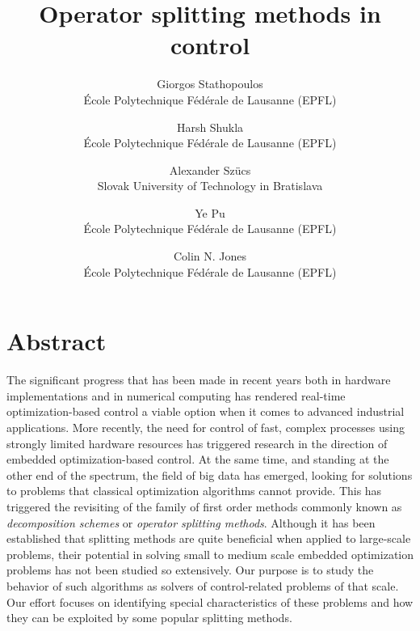 \documentclass[paper=a4, fontsize=11pt]{scrartcl}
\date{}
\title{Operator splitting methods in control}
\begin{document}
\author{
Giorgos Stathopoulos \\
\'Ecole Polytechnique F\'ed\'erale de Lausanne (EPFL) \\
\and
Harsh Shukla \\
\'Ecole Polytechnique F\'ed\'erale de Lausanne (EPFL) \\
\and
Alexander Sz\"{u}cs\\
Slovak University of Technology in Bratislava \\
\and
Ye Pu \\
\'Ecole Polytechnique F\'ed\'erale de Lausanne (EPFL) \\
\and
Colin N. Jones \\
\'Ecole Polytechnique F\'ed\'erale de Lausanne (EPFL) \\
}

\maketitle

\section{Abstract}
The significant progress that has been made in recent years both in hardware implementations and in numerical computing has rendered real-time optimization-based control a viable option when it comes to advanced industrial applications. More recently, the need for control of fast, complex processes using strongly limited hardware resources has triggered research in the direction of embedded optimization-based control. At the same time, and standing at the other end of the spectrum, the field of big data has emerged, looking for solutions to problems that classical optimization algorithms cannot provide. This has triggered the revisiting of the family of first order methods commonly known as \emph{decomposition schemes} or \emph{operator splitting methods}. Although it has been established that splitting methods are quite beneficial when applied to large-scale problems, their potential in solving small to medium scale embedded optimization problems has not been studied so extensively. Our purpose is to study the behavior of such algorithms as solvers of control-related problems of that scale. Our effort focuses on identifying special characteristics of these problems and how they can be exploited by some popular splitting methods. 
\end{document}
